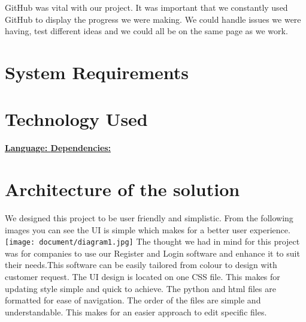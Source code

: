 \documentclass{article}
\begin{document}
GitHub was vital with our project. It was important that we constantly used GitHub to display the progress we were making. We could handle issues we were having, test different ideas and we could all be on the same page as we work.

\maketitle
\section{System Requirements}
 \newline
{}\newline
{}\newline
{}

\maketitle
\section{Technology Used}
\textbf{\underline{Language: }}\newline
\newline
{}\newline
\newline
\textbf{\underline{Dependencies: }}\newline
\newline
{}\newline
{}\newline
{}\newline
{}\newline

\maketitle

\section{Architecture of the solution }
We designed this project to be user friendly and simplistic. From the following images you can see the UI is simple which makes for a better user experience.
\texttt{[image: document/diagram1.jpg]}
The thought we had in mind for this project was for companies to use our Register and Login software and enhance it to suit their needs.This software can be easily tailored from colour to design with customer request.
The UI design is located on one CSS file. This makes for updating style simple and quick to achieve.
The python and html files are formatted for ease of navigation. The order of the files are simple and understandable. This makes for an easier approach to edit specific files.
\end{document}
